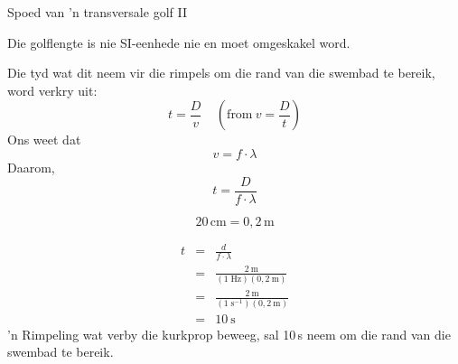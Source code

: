 \begin{definition}
\begin{wex}{Spoed van 'n transversale golf II}
{ Die golflengte is nie SI-eenhede nie en moet omgeskakel word.

Die tyd wat dit neem vir die rimpels om die rand van die swembad te bereik, word verkry uit:
$$t=\frac{D}{v} \ \ \ \ \ (\text{from}\ v=\frac{D}{t})$$
Ons weet dat
\begin{equation*}v=f\cdot \lambda\end{equation*}
Daarom,
\begin{equation}t=\frac{D}{f\cdot \lambda}\end{equation}

\begin{equation*}20\,\text{cm}=0,2\,\text{m}\end{equation*}

\begin{eqnarray*}
t&=&\frac{d}{f\cdot \lambda}\\
&=&\frac{2~\text{m}}{(1\;\text{Hz})(0,2~\text{m})}\\
&=&\frac{2~\text{m}}{(1\;\text{s}^{-1})(0,2~\text{m})}\\
&=&10\ \text{s}
\end{eqnarray*}
 'n Rimpeling wat verby die kurkprop beweeg, sal 10\,s neem om die rand van die swembad te bereik.}
\end{wex}


\end{definition}
